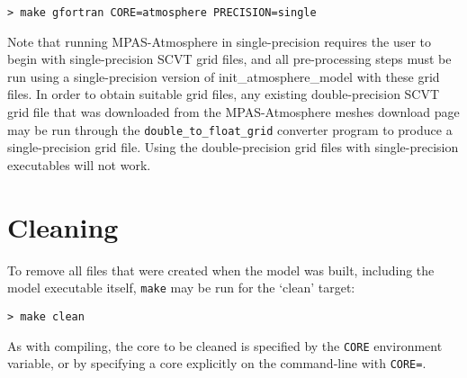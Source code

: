\vspace{12pt}
{\tt > make gfortran CORE=atmosphere PRECISION=single}
\vspace{12pt}

Note that running MPAS-Atmosphere in single-precision requires the user to begin with single-precision SCVT grid files, 
and all pre-processing steps must be run using a single-precision version of init\_atmosphere\_model with these grid files. 
In order to obtain suitable grid files, any existing double-precision SCVT grid file that was downloaded from the MPAS-Atmosphere 
meshes download page may be run through the {\tt double\_to\_float\_grid} converter program to produce a single-precision grid file. 
Using the double-precision grid files with single-precision executables will not work.

\section{Cleaning}

To remove all files  that were created when the model was built,
including the model executable itself, {\tt make} may be run for the
`clean' target:

\vspace{12pt}
{\tt > make clean}
\vspace{12pt}

As with compiling, the core to be cleaned is specified by the {\tt CORE}
environment variable, or by specifying a core explicitly on the
command-line with {\tt CORE=}.
